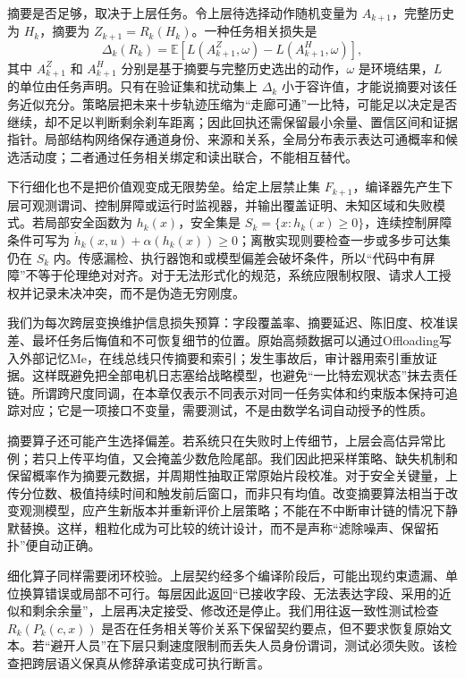 摘要是否足够，取决于上层任务。令上层待选择动作随机变量为 $A_{k+1}$，完整历史为 $H_k$，摘要为 $Z_{k+1}=R_k(H_k)$。一种任务相关损失是
\begin{equation}
 \Delta_k(R_k)=
 \mathbb E\!\left[L(A_{k+1}^{Z},\omega)-L(A_{k+1}^{H},\omega)\right],
\end{equation}
其中 $A_{k+1}^{Z}$ 和 $A_{k+1}^{H}$ 分别是基于摘要与完整历史选出的动作，$\omega$ 是环境结果，$L$ 的单位由任务声明。只有在验证集和扰动集上 $\Delta_k$ 小于容许值，才能说摘要对该任务近似充分。策略层把未来十步轨迹压缩为“走廊可通”一比特，可能足以决定是否继续，却不足以判断剩余刹车距离；因此回执还需保留最小余量、置信区间和证据指针。局部结构网络保存通道身份、来源和关系，全局分布表示表达可通概率和候选活动度；二者通过任务相关绑定和读出联合，不能相互替代。

下行细化也不是把价值观变成无限势垒。给定上层禁止集 $F_{k+1}$，编译器先产生下层可观测谓词、控制屏障或运行时监视器，并输出覆盖证明、未知区域和失败模式。若局部安全函数为 $h_k(x)$，安全集是 $S_k=\{x:h_k(x)\geq0\}$，连续控制屏障条件可写为 $\dot h_k(x,u)+\alpha(h_k(x))\geq0$；离散实现则要检查一步或多步可达集仍在 $S_k$ 内。传感漏检、执行器饱和或模型偏差会破坏条件，所以“代码中有屏障”不等于伦理绝对对齐。对于无法形式化的规范，系统应限制权限、请求人工授权并记录未决冲突，而不是伪造无穷刚度。

我们为每次跨层变换维护信息损失预算：字段覆盖率、摘要延迟、陈旧度、校准误差、最坏任务后悔值和不可恢复细节的位置。原始高频数据可以通过Offloading写入外部记忆Me，在线总线只传摘要和索引；发生事故后，审计器用索引重放证据。这样既避免把全部电机日志塞给战略模型，也避免“一比特宏观状态”抹去责任链。所谓跨尺度同调，在本章仅表示不同表示对同一任务实体和约束版本保持可追踪对应；它是一项接口不变量，需要测试，不是由数学名词自动授予的性质。

摘要算子还可能产生选择偏差。若系统只在失败时上传细节，上层会高估异常比例；若只上传平均值，又会掩盖少数危险尾部。我们因此把采样策略、缺失机制和保留概率作为摘要元数据，并周期性抽取正常原始片段校准。对于安全关键量，上传分位数、极值持续时间和触发前后窗口，而非只有均值。改变摘要算法相当于改变观测模型，应产生新版本并重新评价上层策略；不能在不中断审计链的情况下静默替换。这样，粗粒化成为可比较的统计设计，而不是声称“滤除噪声、保留拓扑”便自动正确。

细化算子同样需要闭环校验。上层契约经多个编译阶段后，可能出现约束遗漏、单位换算错误或局部不可行。每层因此返回“已接收字段、无法表达字段、采用的近似和剩余余量”，上层再决定接受、修改还是停止。我们用往返一致性测试检查 $R_k(P_k(c,x))$ 是否在任务相关等价关系下保留契约要点，但不要求恢复原始文本。若“避开人员”在下层只剩速度限制而丢失人员身份谓词，测试必须失败。该检查把跨层语义保真从修辞承诺变成可执行断言。

